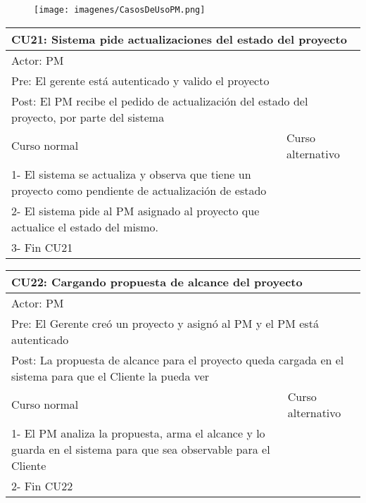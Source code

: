 \begin{figure}[H]
    \texttt{[image: imagenes/CasosDeUsoPM.png]}
\end{figure}

\begin{table}[H]
  \begin{adjustbox}{max width = \textwidth}
  \begin{tabular}{|l|l|}
    \hline
    \multicolumn{2}{|l|}{CU21: Sistema pide actualizaciones del estado del proyecto} \\\hline
    \multicolumn{2}{|l|}{Actor: PM} \\\hline
    \multicolumn{2}{|l|}{Pre: El gerente está autenticado y valido el proyecto} \\\hline
    \multicolumn{2}{|l|}{Post: El PM recibe el pedido de actualización del estado del proyecto, por parte del sistema} \\\hline
     Curso normal & Curso alternativo\\ \hline
     1- El sistema se actualiza y observa que tiene un proyecto como pendiente de actualización de estado & \\ \hline
     2- El sistema pide al PM asignado al proyecto que actualice el estado del mismo. &\\ \hline
     3- Fin CU21 & \\ \hline
 \end{tabular}
  \end{adjustbox}
\end{table}

\begin{table}[H]
  \begin{adjustbox}{max width = \textwidth}
  \begin{tabular}{|l|l|}
    \hline
    \multicolumn{2}{|l|}{CU22: Cargando propuesta de alcance del proyecto} \\\hline
    \multicolumn{2}{|l|}{Actor: PM} \\\hline
    \multicolumn{2}{|l|}{Pre: El Gerente creó un proyecto y asignó al PM y el PM está autenticado} \\\hline
    \multicolumn{2}{|l|}{Post: La propuesta de alcance para el proyecto queda cargada en el sistema para que el Cliente la pueda ver} \\\hline
     Curso normal & Curso alternativo\\ \hline
     1- El PM analiza la propuesta, arma el alcance y lo guarda en el sistema para que sea observable para el Cliente & \\ \hline
     2- Fin CU22 & \\ \hline
 \end{tabular}
  \end{adjustbox}
\end{table}


